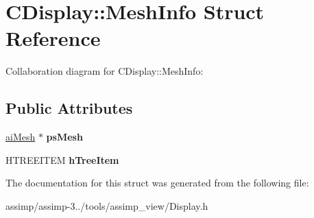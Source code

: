 \hypertarget{struct_c_display_1_1_mesh_info}{\section{C\+Display\+:\+:Mesh\+Info Struct Reference}
\label{struct_c_display_1_1_mesh_info}
}


Collaboration diagram for C\+Display\+:\+:Mesh\+Info\+:
\subsection*{Public Attributes}
\begin{DoxyCompactItemize}
\item 
\hypertarget{struct_c_display_1_1_mesh_info_a75f2be3a287f4f06087c5ea6535753f0}{\hyperlink{structai_mesh}{ai\+Mesh} $\ast$ {\bfseries ps\+Mesh}}\label{struct_c_display_1_1_mesh_info_a75f2be3a287f4f06087c5ea6535753f0}

\item 
\hypertarget{struct_c_display_1_1_mesh_info_afcc386b16e8b0f6c78222eda34b9e86e}{H\+T\+R\+E\+E\+I\+T\+E\+M {\bfseries h\+Tree\+Item}}\label{struct_c_display_1_1_mesh_info_afcc386b16e8b0f6c78222eda34b9e86e}

\end{DoxyCompactItemize}


The documentation for this struct was generated from the following file\+:\begin{DoxyCompactItemize}
\item 
assimp/assimp-\/3../tools/assimp\+\_\+view/Display.\+h\end{DoxyCompactItemize}
